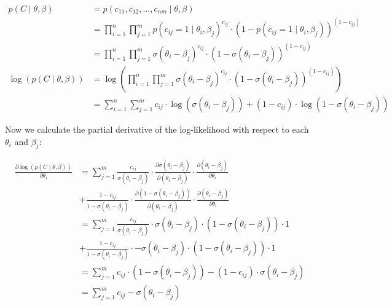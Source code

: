 \documentclass{article}
\begin{document}
\begin{align*}
p(C \mid \theta,\beta) &= p\left( c_{11},c_{12},\ldots,c_{nm} \mid \theta,\beta \right) \\
&= \prod_{i = 1}^{n}\prod_{j = 1}^{m} p\left( c_{ij} = 1 \mid \theta_{i},\beta_{j} \right)^{c_{ij}} \cdot \left( 1 - p\left( c_{ij} = 1 \mid \theta_{i},\beta_{j} \right) \right)^{\left( 1 - c_{ij} \right)} \\
&= \prod_{i = 1}^{n}\prod_{j = 1}^{m}\sigma\left( \theta_{i} - \beta_{j} \right)^{c_{ij}} \cdot \left( 1 - \sigma\left( \theta_{i} - \beta_{j} \right) \right)^{\left( 1 - c_{ij} \right)} \\
\log(p(C \mid \theta,\beta)) &= \log\left( \prod_{i = 1}^{n}\prod_{j = 1}^{m}\sigma\left( \theta_{i} - \beta_{j} \right)^{c_{ij}} \cdot \left( 1 - \sigma\left( \theta_{i} - \beta_{j} \right) \right)^{\left( 1 - c_{ij} \right)} \right) \\
&= \sum_{i = 1}^{n}\sum_{j = 1}^{m} c_{ij} \cdot \log\left( \sigma\left( \theta_{i} - \beta_{j} \right) \right) + \left( 1 - c_{ij} \right) \cdot \log\left( 1 - \sigma\left( \theta_{i} - \beta_{j} \right) \right)
\end{align*}

Now we calculate the partial derivative of the log-likelihood with respect to each $\theta_i$ and $\beta_j$:

\begin{align*}
\frac{\partial\log(p(C \mid \theta,\beta))}{\partial\theta_{i}} &= \sum_{j = 1}^{m}\frac{c_{ij}}{\sigma\left( \theta_{i} - \beta_{j} \right)} \cdot \frac{\partial\sigma\left( \theta_{i} - \beta_{j} \right)}{\partial\left( \theta_{i} - \beta_{j} \right)} \cdot \frac{\partial\left( \theta_{i} - \beta_{j} \right)}{\partial\theta_{i}} \\
&+ \frac{1 - c_{ij}}{1 - \sigma\left( \theta_{i} - \beta_{j} \right)} \cdot \frac{\partial\left( 1 - \sigma\left( \theta_{i} - \beta_{j} \right) \right)}{\partial\left( \theta_{i} - \beta_{j} \right)} \cdot \frac{\partial\left( \theta_{i} - \beta_{j} \right)}{\partial\theta_{i}} \\
&= \sum_{j = 1}^{m}\frac{c_{ij}}{\sigma\left( \theta_{i} - \beta_{j} \right)} \cdot \sigma\left( \theta_{i} - \beta_{j} \right) \cdot \left( 1 - \sigma\left( \theta_{i} - \beta_{j} \right) \right) \cdot 1 \\
&+ \frac{1 - c_{ij}}{1 - \sigma\left( \theta_{i} - \beta_{j} \right)} \cdot - \sigma\left( \theta_{i} - \beta_{j} \right) \cdot \left( 1 - \sigma\left( \theta_{i} - \beta_{j} \right) \right) \cdot 1 \\
&= \sum_{j = 1}^{m} c_{ij} \cdot \left( 1 - \sigma\left( \theta_{i} - \beta_{j} \right) \right) - \left( 1 - c_{ij} \right) \cdot \sigma\left( \theta_{i} - \beta_{j} \right) \\
&= \sum_{j = 1}^{m} c_{ij} - \sigma\left( \theta_{i} - \beta_{j} \right)
\end{align*}
\end{document}
